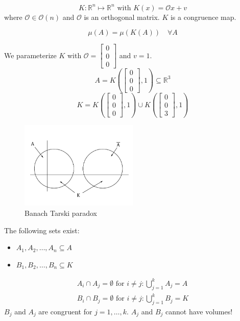 \documentclass{article}
\begin{document}
\[ K: \mathbb R^n \mapsto \mathbb R^n \text{ with } K(x) = \mathcal O x + v \]
where $\mathcal O \in \mathcal O(n)$ and $\mathcal O$ is an orthogonal matrix.
$K$ is a congruence map.

\[ \mu(A) = \mu(K(A)) \quad \forall A \]

We parameterize $K$ with $\mathcal O = \begin{bmatrix} 0 \\ 0 \\ 0 \end{bmatrix}$ and $v = 1$.
\[ A = K(\begin{bmatrix} 0 \\ 0 \\ 0 \end{bmatrix}, 1) \subseteq \mathbb R^3 \]
\[ K = K(\begin{bmatrix} 0 \\ 0 \\ 0 \end{bmatrix}, 1) \cup K\left(\begin{bmatrix} 0 \\ 0 \\ 3 \end{bmatrix}, 1\right) \]

\begin{figure}[!h]
  \begin{center}
    \includegraphics[width=0.5\textwidth]{img/08_bt_paradox.pdf}
    \caption{Banach Tarski paradox}
  \end{center}
\end{figure}

The following sets exist:
\begin{itemize}
  \item $A_1, A_2, \ldots, A_n \subseteq A$
  \item $B_1, B_2, \ldots, B_n \subseteq K$
\end{itemize}

\begin{align*}
  A_i \cap A_j = \emptyset \text{ for } i \neq j: \bigcup_{j=1}^k A_j = A \\
  B_i \cap B_j = \emptyset \text{ for } i \neq j: \bigcup_{j=1}^k B_j = K
\end{align*}
$B_j$ and $A_j$ are congruent for $j=1,\ldots,k$.
$A_j$ and $B_j$ cannot have volumes! %
\end{document}
